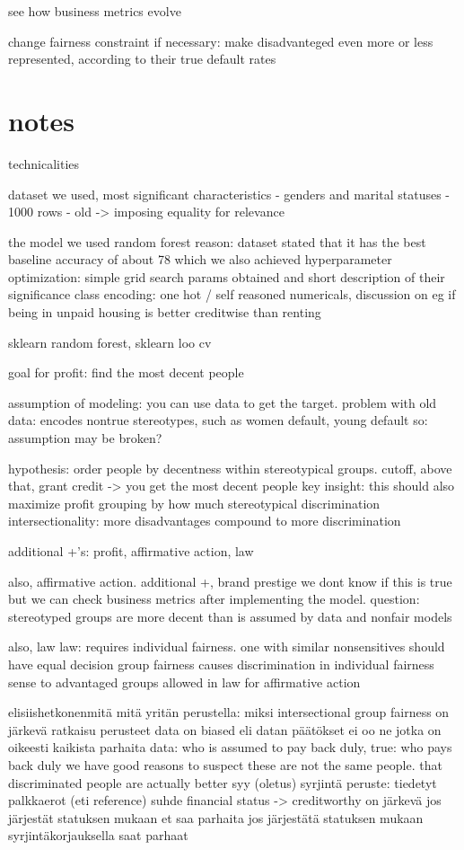 \documentclass{article}
\begin{document}
see how business metrics evolve

change fairness constraint if necessary: make disadvanteged even more 
or less represented, according to their true default rates

\section*{notes}

technicalities 


dataset we used, most significant characteristics
    - genders and marital statuses
    - 1000 rows
    - old -> imposing equality for relevance

the model we used
    random forest
        reason: dataset stated that it has the best baseline accuracy of about 78%
            which we also achieved
    hyperparameter optimization: simple grid search
        params obtained and short description of their significance
    class encoding: one hot / self reasoned numericals, discussion on 
        eg if being in unpaid housing is better creditwise than renting  
        
sklearn random forest, sklearn loo cv


goal for profit: find the most decent people

assumption of modeling: you can use data to get the target.
    problem with old data: encodes nontrue stereotypes, such as women default, young default 
    so: assumption may be broken?

hypothesis: order people by decentness within stereotypical groups.
cutoff, above that, grant credit -> you get the most decent people 
    key insight: this should also maximize profit
grouping by how much stereotypical discrimination
    intersectionality: more disadvantages compound to more discrimination    

additional +'s: profit, affirmative action, law

also, affirmative action. additional +, brand prestige
we dont know if this is true but we can check business metrics after implementing 
    the model.
question: stereotyped groups are more decent than is assumed by data and nonfair models

also, law
law: requires individual fairness. one with similar nonsensitives should 
    have equal decision 
group fairness causes discrimination in individual fairness sense to advantaged groups 
    allowed in law for affirmative action 

elisiishetkonenmitä
mitä yritän perustella: miksi intersectional group fairness on järkevä ratkaisu
perusteet
    data on biased eli datan päätökset ei oo ne jotka on oikeesti kaikista parhaita
        data: who is assumed to pay back duly, true: who pays back duly 
        we have good reasons to suspect these are not the same people. that discriminated people are actually better
        syy (oletus) syrjintä
        peruste: tiedetyt palkkaerot (eti reference)
    suhde financial status -> creditworthy on järkevä
    jos järjestät statuksen mukaan et saa parhaita
        jos järjestätä statuksen mukaan syrjintäkorjauksella saat parhaat
\end{document}
